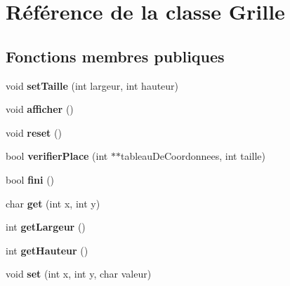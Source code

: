 \hypertarget{class_grille}{}\section{Référence de la classe Grille}
\label{class_grille}
\subsection*{Fonctions membres publiques}
\begin{DoxyCompactItemize}
\item 
void {\bfseries set\+Taille} (int largeur, int hauteur)\hypertarget{class_grille_a31a4d8228d67077f23bce0a5af8dfbdc}{}\label{class_grille_a31a4d8228d67077f23bce0a5af8dfbdc}

\item 
void {\bfseries afficher} ()\hypertarget{class_grille_a7226b2d591556df270e52964a93a450c}{}\label{class_grille_a7226b2d591556df270e52964a93a450c}

\item 
void {\bfseries reset} ()\hypertarget{class_grille_a64a3769c329fede0758e122b3c22205a}{}\label{class_grille_a64a3769c329fede0758e122b3c22205a}

\item 
bool {\bfseries verifier\+Place} (int $\ast$$\ast$tableau\+De\+Coordonnees, int taille)\hypertarget{class_grille_ace593f30f594c04ec3b46cc25b514b67}{}\label{class_grille_ace593f30f594c04ec3b46cc25b514b67}

\item 
bool {\bfseries fini} ()\hypertarget{class_grille_ac709fec5615da2df24f1f39bafd07008}{}\label{class_grille_ac709fec5615da2df24f1f39bafd07008}

\item 
char {\bfseries get} (int x, int y)\hypertarget{class_grille_a835c5667c75f261732d4812b4c85cb43}{}\label{class_grille_a835c5667c75f261732d4812b4c85cb43}

\item 
int {\bfseries get\+Largeur} ()\hypertarget{class_grille_a3fd72238a85bdef86df421f84e0f3d71}{}\label{class_grille_a3fd72238a85bdef86df421f84e0f3d71}

\item 
int {\bfseries get\+Hauteur} ()\hypertarget{class_grille_ac95b39a21f7a1f1cfb2bb57b96c1adaf}{}\label{class_grille_ac95b39a21f7a1f1cfb2bb57b96c1adaf}

\item 
void {\bfseries set} (int x, int y, char valeur)\hypertarget{class_grille_afd11a52c6fd45e1417fd1094df2b0bca}{}\label{class_grille_afd11a52c6fd45e1417fd1094df2b0bca}

\end{DoxyCompactItemize}
